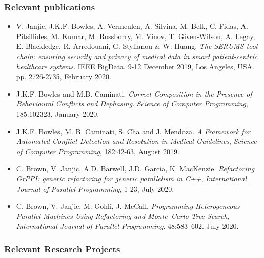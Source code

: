 \documentclass[a4paper,11pt]{article}
\begin{document}
\subsubsection*{Relevant publications}
\begin{itemize}
\item 
V. Janjic, J.K.F. Bowles, A. Vermeulen, A. Silvina, M. Belk, C. Fidas, A. Pitsillides, M. Kumar, M. Rossborry, M. Vinov, T. Given-Wilson, A. Legay, E. Blackledge, R. Arredouani, G. Stylianou \& W. Huang.
\emph{The SERUMS tool-chain: ensuring security and privacy of medical data in smart patient-centric healthcare systems}.  IEEE BigData. 9-12 December 2019, Los Angeles, USA. pp. 2726-2735, February 2020.
\item J.K.F. Bowles and M.B. Caminati.
\emph{Correct Composition in the Presence of Behavioural Conflicts and Dephasing}.  \emph{Science of Computer Programming}, 185:102323, January 2020. 
\item 
J.K.F. Bowles, M. B. Caminati, S. Cha and J. Mendoza.
\emph{A Framework for Automated Conflict Detection and Resolution in Medical Guidelines},  \emph{Science of Computer Programming}, 182:42-63, August 2019. 
\item 
C. Brown, V. Janjic, A.D. Barwell, J.D. Garcia, K. MacKenzie.
\emph{Refactoring GrPPI: generic refactoring for generic parallelism in C++},
\emph{International Journal of Parallel Programming}, 1-23, July 2020.
\item 
C. Brown, V. Janjic, M. Gohli, J. McCall.
\emph{Programming Heterogeneous Parallel Machines Using Refactoring and Monte–Carlo Tree Search},
\emph{International Journal of Parallel Programming}. 48:583–602. July 2020. 
\end{itemize}

\subsubsection*{Relevant Research Projects}
\end{document}
